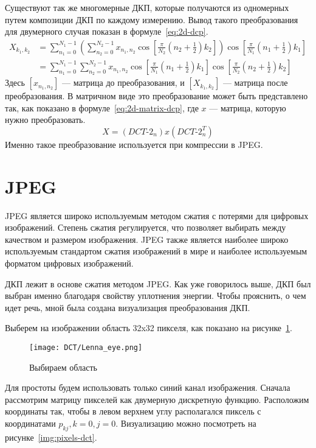 Существуют так же многомерные ДКП, которые получаются из одномерных путем композиции ДКП по каждому измерению.
Вывод такого преобразования для двумерного случая показан в формуле~\ref{eq:2d-dcp}.
\begin{align}
    X_{k_1,k_2} &= \nonumber
    \sum_{n_1=0}^{N_1-1}
    \left( \sum_{n_2=0}^{N_2-1}
    x_{n_1,n_2} 
    \cos \left[\frac{\pi}{N_2} \left(n_2+\frac{1}{2}\right) k_2 \right]\right)
    \cos \left[\frac{\pi}{N_1} \left(n_1+\frac{1}{2}\right) k_1 \right]\\
    &= \sum_{n_1=0}^{N_1-1}
    \sum_{n_2=0}^{N_2-1}
    x_{n_1,n_2} 
    \cos \left[\frac{\pi}{N_1} \left(n_1+\frac{1}{2}\right) k_1 \right]
    \cos \left[\frac{\pi}{N_2} \left(n_2+\frac{1}{2}\right) k_2 \right] \label{eq:2d-dcp}
\end{align}
Здесь $[x_{n_1,n_2}]$ --- матрица до преобразования, и $[X_{k_1,k_2}]$ --- матрица
после преобразования.
В матричном виде это преобразование может быть представлено так, как показано
в формуле~\ref{eq:2d-matrix-dcp}, где $x$ --- матрица, которую нужно преобразовать.
\begin{equation} \label{eq:2d-matrix-dcp}
    X = ({DCT}\text{-}2_n) x ({DCT}\text{-}2_n ^ T)
\end{equation}
Именно такое преобразование используется при компрессии в JPEG.

\section{JPEG}
JPEG является широко используемым методом сжатия с потерями для цифровых изображений.
Степень сжатия регулируется, что позволяет выбирать между качеством и размером изображения.
JPEG также является наиболее широко используемым стандартом сжатия изображений в мире и
наиболее используемым форматом цифровых изображений.

ДКП лежит в основе сжатия методом JPEG. Как уже говорилось выше,
ДКП был выбран именно благодаря свойству уплотнения энергии. Чтобы прояснить,
о чем идет речь, мной была создана визуализация преобразования ДКП.

Выберем на изображении область 32x32 пикселя, как показано на рисунке~\ref{img:lenna-eye}.

\begin{figure}[ht!]
    \centering
    \texttt{[image: DCT/Lenna\_eye.png]}
    \caption{Выбираем область}
    \label{img:lenna-eye}
\end{figure}

Для простоты будем использовать только синий канал изображения.
Сначала рассмотрим матрицу пикселей как двумерную дискретную функцию.
Расположим координаты так, чтобы в левом верхнем углу
располагался пиксель с координатами $p_{kj}, k = 0, j = 0$.
Визуализацию можно посмотреть на рисунке~\ref{img:pixels-dct}.

